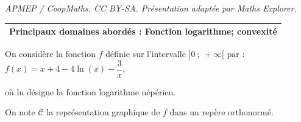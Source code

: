 \documentclass[10pt]{article}
\begin{document}
\noindent\textit{APMEP / CoopMaths. CC BY-SA. Présentation adaptée par Maths Explorer.}\par\medskip
\medskip

\begin{tabularx}{\linewidth}{|X|}\hline
\textbf{Principaux domaines abordés : Fonction logarithme; convexité}
\\ \hline
\end{tabularx}

\medskip

On considère la fonction $f$ définie sur l'intervalle $]0~;~ +\infty[$ par :
$f(x) = x + 4 - 4\ln (x) - \dfrac{3}{x}$,

où ln désigne la fonction logarithme népérien.

On note $\mathcal{C}$ la représentation graphique de $f$ dans un repère orthonormé.

\medskip
\end{document}
